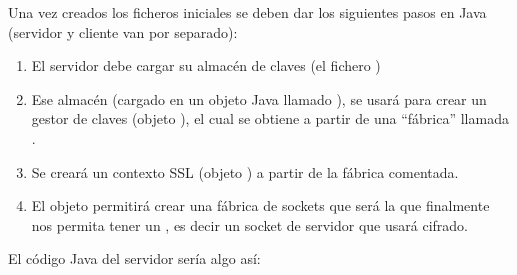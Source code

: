 \documentclass[a4paper,12pt,spanish]{sphinxmanual}
\begin{document}
Una vez creados los ficheros iniciales se deben dar los siguientes pasos en Java (servidor y cliente van por separado):
\begin{enumerate}
\item {} 
El servidor debe cargar su almacén de claves (el fichero )

\item {} 
Ese almacén (cargado en un objeto Java llamado ), se usará para crear un gestor de claves (objeto ), el cual se obtiene a partir de una ``fábrica'' llamada .

\item {} 
Se creará un contexto SSL (objeto ) a partir de la fábrica comentada.

\item {} 
El objeto  permitirá crear una fábrica de sockets que será la que finalmente nos permita tener un , es decir un socket de servidor que usará cifrado.

\end{enumerate}

El código Java del servidor sería algo así:
\end{document}

